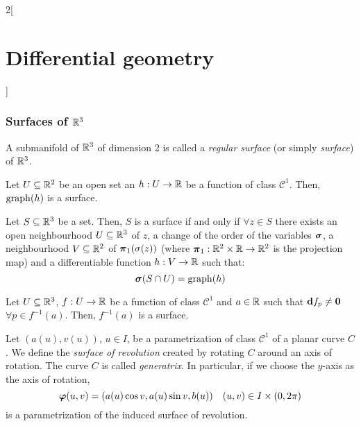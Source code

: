 \documentclass[../../../main.tex]{subfiles}
\begin{document}
\begin{multicols}{2}[\section{Differential geometry}]
  \subsubsection{Surfaces of \texorpdfstring{$\mathbb{R}^3$}{R3}}
  \begin{definition}
    A submanifold of $\mathbb{R}^3$ of dimension 2 is called a \emph{regular surface} (or simply \emph{surface}) of $\mathbb{R}^3$.
  \end{definition}
  \begin{proposition}
    Let $U\subseteq\mathbb{R}^2$ be an open set an $h:U\rightarrow\mathbb{R}$ be a function of class $\mathcal{C}^1$. Then, $\operatorname{graph} (h)$ is a surface.
  \end{proposition}
  \begin{proposition}
    Let $S\subseteq\mathbb{R}^3$ be a set. Then, $S$ is a surface if and only if $\forall z\in S$ there exists an open neighbourhood $U\subseteq \mathbb{R}^3$ of $z$, a change of the order of the variables $\boldsymbol{\mathrm{\sigma}}$, a neighbourhood $V\subseteq \mathbb{R}^2$ of $\boldsymbol{\mathrm{\pi}}_1(\sigma(z))$ (where $\boldsymbol{\mathrm{\pi}}_1:\mathbb{R}^2\times \mathbb{R}\rightarrow\mathbb{R}^2$ is the projection map) and a differentiable function $h:V\rightarrow \mathbb{R}$ such that: $$\boldsymbol{\mathrm{\sigma}}(S\cap U)=\operatorname{graph}(h)$$
  \end{proposition}
  \begin{proposition}
    Let $U\subseteq\mathbb{R}^3$, $f:U\rightarrow\mathbb{R}$ be a function of class $\mathcal{C}^1$ and $a\in\mathbb{R}$ such that $\boldsymbol{\mathrm{d}}f_p\ne\boldsymbol{\mathrm{0}}$ $\forall p\in f^{-1}(a)$. Then, $f^{-1}(a)$ is a surface.
  \end{proposition}
  \begin{definition}
    Let $(a(u),v(u))$, $u\in I$, be a parametrization of class $\mathcal{C}^1$ of a planar curve $C$. We define the \emph{surface of revolution} created by rotating $C$ around an axis of rotation. The curve $C$ is called \emph{generatrix}. In particular, if we choose the $y$-axis as the axis of rotation, $$\boldsymbol{\mathrm{\varphi}}(u,v)=(a(u)\cos v,a(u)\sin v,b(u))\quad (u,v)\in I\times (0,2\pi)$$
    is a parametrization of the induced surface of revolution.
  \end{definition}

\end{multicols}
\end{document}
